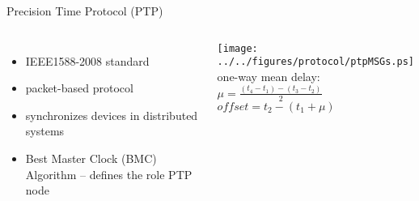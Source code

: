 \documentclass[compress,red]{beamer}
\begin{document}
\begin{frame}{Precision Time Protocol (PTP)}
\begin{columns}[c]
\column{2.8in}

  \begin{itemize}
    \item IEEE1588-2008 standard
    \item packet-based protocol 
    \item synchronizes devices in distributed systems
    \item Best Master Clock (BMC) Algorithm -- defines the role PTP node 
  \end{itemize}

\column{1.5in}
    \texttt{[image: ../../figures/protocol/ptpMSGs.ps]} \\
    \small 
    one-way mean delay: \\
    $\mu = \frac{(t_{4}-t_{1}) - (t_{3}-t_{2})}{2}$ \\
    \small 
    $offset = t_{2} - (t_{1} + \mu)$
    
\end{columns}


\end{frame}
\end{document}

